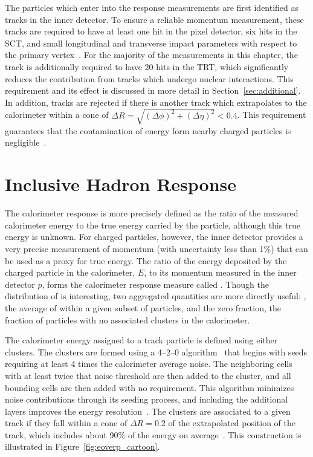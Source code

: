 The particles which enter into the response measurements are first identified as tracks in the inner detector.
To ensure a reliable momentum measurement, these tracks are required to have at least one hit in the pixel detector, six hits in the SCT, and small longitudinal and transverse impact parameters with respect to the primary vertex~\cite{PERF-2011-05}.
For the majority of the measurements in this chapter, the track is additionally required to have 20 hits in the TRT, which significantly reduces the contribution from tracks which undergo nuclear interactions.
This requirement and its effect is discussed in more detail in Section~\ref{sec:additional}. 
In addition, tracks are rejected if there is another track which extrapolates to the calorimeter within a cone of $\Delta R = \sqrt{(\Delta\phi)^2 + (\Delta\eta)^2} < 0.4$.
This requirement guarantees that the contamination of energy form nearby charged particles is negligible~\cite{PERF-2011-05}.


\section{Inclusive Hadron Response}
\label{sec:inclusive}

The calorimeter response is more precisely defined as the ratio of the measured calorimeter energy to the true energy carried by the particle, although this true energy is unknown. 
For charged particles, however, the inner detector provides a very precise measurement of momentum (with uncertainty less than 1\%) that can be used as a proxy for true energy.
The ratio of the energy deposited by the charged particle in the calorimeter, $E$, to its momentum measured in the inner detector $p$, forms the calorimeter response measure called \ep.
Though the distribution of \ep is interesting, two aggregated quantities are more directly useful: \epav, the average of \ep within a given subset of particles, and the zero fraction, the fraction of particles with no associated clusters in the calorimeter.

The calorimeter energy assigned to a track particle is defined using either clusters. 
The clusters are formed using a 4--2--0 algorithm~\cite{TopoClusters} that begins with seeds requiring at least 4 times the calorimeter average noise. 
The neighboring cells with at least twice that noise threshold are then added to the cluster, and all bounding cells are then added with no requirement. 
This algorithm minimizes noise contributions through its seeding process, and including the additional layers improves the energy resolution~\cite{Speckmayer}.
The clusters are associated to a given track if they fall within a cone of $\Delta R = 0.2$ of the extrapolated position of the track, which includes about 90\% of the energy on average~\cite{PERF-2011-05}.
This construction is illustrated in Figure~\ref{fig:eoverp_cartoon}.

